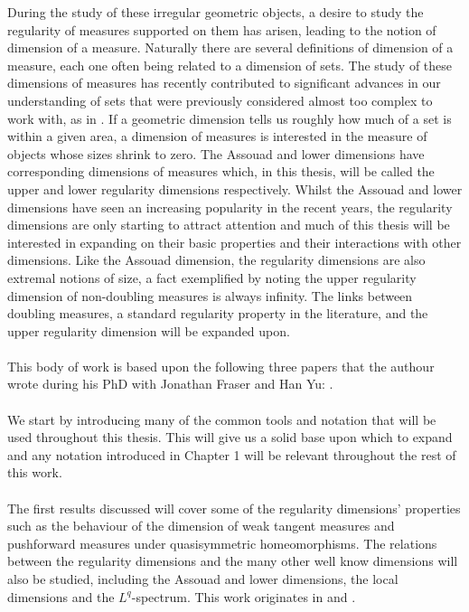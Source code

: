 During the study of these irregular geometric objects, a desire to study the regularity of measures supported on them has arisen, leading to the notion of dimension of a measure. Naturally there are several definitions of dimension of a measure, each one often being related to a dimension of sets. The study of these dimensions of measures has recently contributed to significant advances in our understanding of sets that were previously considered almost too complex to work with, as in \cite{hochman}. If a geometric dimension tells us roughly how much of a set is within a given area, a dimension of measures is interested in the measure of objects whose sizes shrink to zero. The Assouad and lower dimensions have corresponding dimensions of measures which, in this thesis, will be called the upper and lower regularity dimensions respectively. Whilst the Assouad and lower dimensions have seen an increasing popularity in the recent years, the regularity dimensions are only starting to attract attention and much of this thesis will be interested in expanding on their basic properties and their interactions with other dimensions. Like the Assouad dimension, the regularity dimensions are also extremal notions of size, a fact exemplified by noting the upper regularity dimension of non-doubling measures is always infinity. The links between doubling measures, a standard regularity property in the literature, and the upper regularity dimension will be expanded upon. 
\\ \\
This body of work is based upon the following three papers that the authour wrote during his PhD with Jonathan Fraser and Han Yu: \cite{fraser-howroyd,howroyd,howroyd-yu}. 
\\ \\
We start by introducing many of the common tools and notation that will be used throughout this thesis. This will give us a solid base upon which to expand and any notation introduced in Chapter 1 will be relevant throughout the rest of this work.
\\ \\
The first results discussed will cover some of the regularity dimensions' properties such as the behaviour of the dimension of weak tangent measures and pushforward measures under quasisymmetric homeomorphisms. The relations between the regularity dimensions and the many other well know dimensions will also be studied, including the Assouad and lower dimensions, the local dimensions and the $L^q$-spectrum. This work originates in \cite{fraser-howroyd} and \cite{howroyd}.
